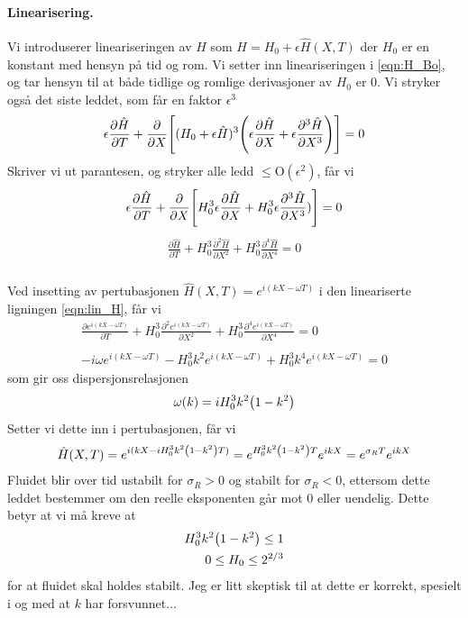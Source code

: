 \documentclass[12p,a4paper]{article}
\renewcommand{\exp}{e^}
\newcommand{\h}{\hat}
\begin{document}
\paragraph{Linearisering.}
Vi introduserer lineariseringen av $H$ som $H = H_0 + \epsilon \h H(X,T)$ der $H_0$ er en konstant med hensyn på tid og rom. Vi setter inn lineariseringen i \ref{eqn:H_Bo}, og tar hensyn til at både tidlige og romlige derivasjoner av $H_0$ er 0. Vi stryker også det siste leddet, som får en faktor $\epsilon^3$
\begin{align*}
    \epsilon\frac{\partial \h H}{\partial T} + \frac{\partial}{\partial X}\qty[(H_0 + \epsilon \h H)^3\qty(\epsilon\frac{\partial \h H}{\partial X} + \epsilon\frac{\partial^3 \h H}{\partial X^3})] = 0
\end{align*}
Skriver vi ut parantesen, og stryker alle ledd $\leq \mathrm{O}(\epsilon^2)$, får vi
\begin{align*}
    \epsilon\frac{\partial \h H}{\partial T} + \frac{\partial}{\partial X}\qty[H_0^3 \epsilon \frac{\partial \h H}{\partial X} + H_0^3 \epsilon\frac{\partial^3 \h H}{\partial X^3})] = 0
\end{align*}
\begin{align}\label{eqn:lin_H}
    \frac{\partial \h H}{\partial T} + H_0^3\frac{\partial^2 \h H}{\partial X^2} + H_0^3\frac{\partial^4 \h H}{\partial X^4} = 0
\end{align}


\subsubsection{}
Ved insetting av pertubasjonen $\h H(X,T) = \exp{i(kX - \omega T)}$ i den lineariserte ligningen \ref{eqn:lin_H}, får vi
\begin{align*}
    \frac{\partial \exp{i(kX - \omega T)}}{\partial T} + H_0^3\frac{\partial^2 \exp{i(kX - \omega T)}}{\partial X^2} + H_0^3\frac{\partial^4 \exp{i(kX - \omega T)}}{\partial X^4} = 0 \\
    \\
    -i\omega \exp{i(kX - \omega T)} - H_0^3 k^2 \exp{i(kX - \omega T)} + H_0^3 k^4\exp{i(kX - \omega T)} = 0
\end{align*}
som gir oss dispersjonsrelasjonen
\begin{align}
    \omega(k) = iH_0^3k^2\qty(1 - k^2)
\end{align}
Setter vi dette inn i pertubasjonen, får vi
\begin{align*}
    \h H(X,T) = \exp{i(kX - iH_0^3k^2\qty(1 - k^2) T)} = \exp{H_0^3k^2\qty(1 - k^2)T}\exp{ikX} = \exp{\sigma_R T}\exp{ikX}
\end{align*}
Fluidet blir over tid ustabilt for $\sigma_R > 0$ og stabilt for $\sigma_R < 0$, ettersom dette leddet bestemmer om den reelle eksponenten går mot 0 eller uendelig. Dette betyr at vi må kreve at
\begin{align*}
    H_0^3k^2\qty(1 - k^2) \leq 1 \\
    0 \leq H_0 \leq 2^{2/3}
\end{align*}
for at fluidet skal holdes stabilt. Jeg er litt skeptisk til at dette er korrekt, spesielt i og med at $k$ har forsvunnet...
\end{document}
